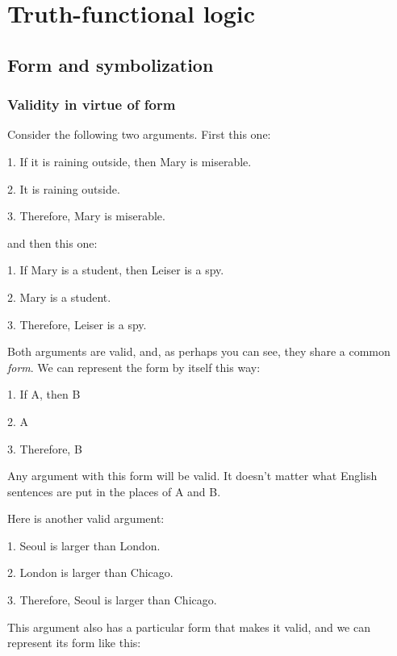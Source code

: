 \part{Truth-functional logic}
\label{ch.TFL}

\chapter{Form and symbolization}\label{symbolization}

\section{Validity in virtue of form}\label{s:ValidityInVirtueOfForm}
Consider the following two arguments. First this one:
	\begin{earg}
		\item[1.] If it is raining outside, then Mary is miserable.
		\item[2.] It is raining outside.
		\item[3.] Therefore, Mary is miserable.
	\end{earg}
and then this one:
	\begin{earg}
		\item[1.] If Mary is a student, then Leiser is a spy.
		\item[2.] Mary is a student.
		\item[3.] Therefore, Leiser is a spy.
	\end{earg}
Both arguments are valid, and, as perhaps you  can see, they share a common \textit{form}. We can represent the form by itself this way:
	\begin{earg}
		\item[1.] If A, then B
		\item[2.] A
		\item[3.] Therefore, B
	\end{earg}
Any argument with this form will be valid. It doesn't matter what English sentences are put in the places of A and B. 

Here is another valid argument:
	\begin{earg}
		\item[1.] Seoul is larger than London.
		\item[2.] London is larger than Chicago.
		\item[3.] Therefore, Seoul is larger than Chicago. 
	\end{earg}
This argument also has a particular form that makes it valid, and we can represent its form like this:
\bigskip

